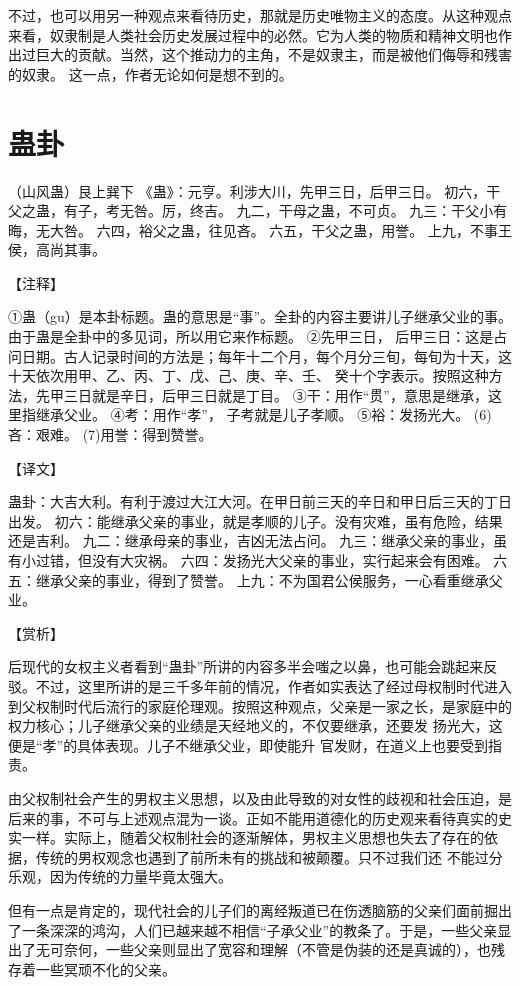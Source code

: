 \documentclass[a4paper,12pt,UTF8,twoside]{ctexbook}
\begin{document}
不过，也可以用另一种观点来看待历史，那就是历史唯物主义的态度。从这种观点来看，奴隶制是人类社会历史发展过程中的必然。它为人类的物质和精神文明也作出过巨大的贡献。当然，这个推动力的主角，不是奴隶主，而是被他们侮辱和残害的奴隶。 这一点，作者无论如何是想不到的。

\chapter{蛊卦}

（山风蛊）艮上巽下
《蛊》：元亨。利涉大川，先甲三日，后甲三日。
初六，干父之蛊，有子，考无咎。厉，终吉。
九二，干母之蛊，不可贞。
九三：干父小有晦，无大咎。
六四，裕父之蛊，往见吝。
六五，干父之蛊，用誉。
上九，不事王侯，高尚其事。

【注释】

①蛊（gu）是本卦标题。蛊的意思是“事”。全卦的内容主要讲儿子继承父业的事。由于蛊是全卦中的多见词，所以用它来作标题。
②先甲三日， 后甲三日：这是占问日期。古人记录时间的方法是；每年十二个月，每个月分三旬，每旬为十天，这十天依次用甲、乙、丙、丁、戊、己、庚、辛、壬、 癸十个字表示。按照这种方法，先甲三日就是辛日，后甲三日就是丁目。
③干：用作“贯”，意思是继承，这里指继承父业。
④考：用作“孝”， 子考就是儿子孝顺。
⑤裕：发扬光大。
(6)吝：艰难。
(7)用誉：得到赞誉。

【译文】

蛊卦：大吉大利。有利于渡过大江大河。在甲日前三天的辛日和甲日后三天的丁日出发。
初六：能继承父亲的事业，就是孝顺的儿子。没有灾难，虽有危险，结果还是吉利。
九二：继承母亲的事业，吉凶无法占问。
九三：继承父亲的事业，虽有小过错，但没有大灾祸。
六四：发扬光大父亲的事业，实行起来会有困难。
六五：继承父亲的事业，得到了赞誉。
上九：不为国君公侯服务，一心看重继承父业。

【赏析】

后现代的女权主义者看到“蛊卦”所讲的内容多半会嗤之以鼻，也可能会跳起来反驳。不过，这里所讲的是三千多年前的情况，作者如实表达了经过母权制时代进入到父权制时代后流行的家庭伦理观。按照这种观点，父亲是一家之长，是家庭中的权力核心；儿子继承父亲的业绩是天经地义的，不仅要继承，还要发 扬光大，这便是“孝”的具体表现。儿子不继承父业，即使能升 官发财，在道义上也要受到指责。

由父权制社会产生的男权主义思想，以及由此导致的对女性的歧视和社会压迫，是后来的事，不可与上述观点混为一谈。正如不能用道德化的历史观来看待真实的史实一样。实际上，随着父权制社会的逐渐解体，男权主义思想也失去了存在的依据，传统的男权观念也遇到了前所未有的挑战和被颠覆。只不过我们还 不能过分乐观，因为传统的力量毕竟太强大。

但有一点是肯定的，现代社会的儿子们的离经叛道已在伤透脑筋的父亲们面前掘出了一条深深的鸿沟，人们已越来越不相信“子承父业”的教条了。于是，一些父亲显出了无可奈何，一些父亲则显出了宽容和理解（不管是伪装的还是真诚的），也残存着一些冥顽不化的父亲。
\end{document}
